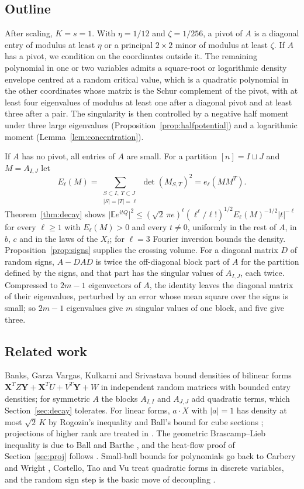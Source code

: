 \documentclass[11pt]{amsart}
\numberwithin{equation}{section}
\theoremstyle{definition}
\theoremstyle{remark}
\newcommand{\E}{\mathbb E}
\newcommand{\1}{\mathbf 1}
\newcommand{\abs}[1]{\lvert #1\rvert}
\begin{document}
\subsection*{Outline}
After scaling, $K=s=1$. With $\eta=1/12$ and $\zeta=1/256$, a pivot of $A$ is a diagonal entry of modulus at least $\eta$ or a principal $2\times2$ minor of modulus at least $\zeta$. If $A$ has a pivot, we condition on the coordinates outside it. The remaining polynomial in one or two variables admits a square-root or logarithmic density envelope centred at a random critical value, which is a quadratic polynomial in the other coordinates whose matrix is the Schur complement of the pivot, with at least four eigenvalues of modulus at least one after a diagonal pivot and at least three after a pair. The singularity is then controlled by a negative half moment under three large eigenvalues (Proposition~\ref{prop:halfpotential}) and a logarithmic moment (Lemma~\ref{lem:concentration}).

If $A$ has no pivot, all entries of $A$ are small. For a partition $[n]=I\sqcup J$ and $M=A_{I,J}$ let
\[
E_\ell(M)=\sum_{\substack{S\subset I,\ T\subset J\\ \abs S=\abs T=\ell}}\det(M_{S,T})^2=e_\ell(MM^T).
\]
Theorem~\ref{thm:decay} shows $\abs{\E e^{itQ}}^2\le(\sqrt2\,\pi e)^\ell(\ell^\ell/\ell!)^{1/2}E_\ell(M)^{-1/2}\abs t^{-\ell}$ for every $\ell\ge1$ with $E_\ell(M)>0$ and every $t\ne0$, uniformly in the rest of $A$, in $b$, $c$ and in the laws of the $X_i$; for $\ell=3$ Fourier inversion bounds the density. Proposition~\ref{prop:signs} supplies the crossing volume. For a diagonal matrix $D$ of random signs, $A-DAD$ is twice the off-diagonal block part of $A$ for the partition defined by the signs, and that part has the singular values of $A_{I,J}$, each twice. Compressed to $2m-1$ eigenvectors of $A$, the identity leaves the diagonal matrix of their eigenvalues, perturbed by an error whose mean square over the signs is small; so $2m-1$ eigenvalues give $m$ singular values of one block, and five give three.

\subsection*{Related work}
Banks, Garza Vargas, Kulkarni and Srivastava \cite[Theorem~2.1]{BGKS} bound densities of bilinear forms $\mathbf X^T Z\mathbf Y+\mathbf X^TU+V^T\mathbf Y+W$ in independent random matrices with bounded entry densities; for symmetric $A$ the blocks $A_{I,I}$ and $A_{J,J}$ add quadratic terms, which Section~\ref{sec:decay} tolerates. For linear forms, $a\cdot X$ with $\abs a=1$ has density at most $\sqrt2\,K$ by Rogozin's inequality \cite{Rogozin} and Ball's bound for cube sections \cite{Ball}; projections of higher rank are treated in \cite{RV,LPP}. The geometric Brascamp--Lieb inequality is due to Ball \cite{Ball} and Barthe \cite{Barthe}, and the heat-flow proof of Section~\ref{sec:proj} follows \cite{CLL,BCCT}. Small-ball bounds for polynomials go back to Carbery and Wright \cite{CW}, Costello, Tao and Vu \cite{CTV} treat quadratic forms in discrete variables, and the random sign step is the basic move of decoupling \cite{DG}.
\end{document}

